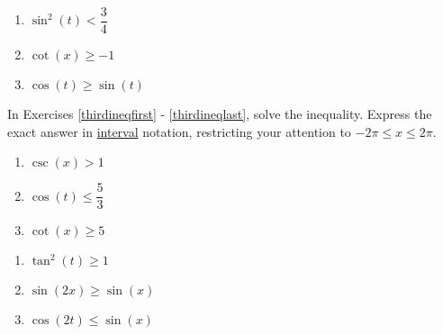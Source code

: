 \documentclass{ximera}
\begin{document}
\begin{multicols}{3}

\begin{enumerate}

\setcounter{enumi}{\value{HW}}

\item $\sin^{2} \left( t \right) < \dfrac{3}{4}$
\item $\cot \left( x \right) \geq -1$ 
\item $\cos(t) \geq \sin(t)$  \label{secondineqlast}

\setcounter{HW}{\value{enumi}}

\end{enumerate}

\end{multicols}


In Exercises \ref{thirdineqfirst} - \ref{thirdineqlast}, solve the inequality.  Express the exact answer in \underline{interval} notation, restricting your attention to $-2\pi \leq x \leq 2\pi$.

\begin{multicols}{3}

\begin{enumerate}

\setcounter{enumi}{\value{HW}}

\item $\csc \left( x \right) > 1$  \label{thirdineqfirst}
\item  $\cos(t) \leq \dfrac{5}{3}$
\item  $\cot(x) \geq 5$ 

\setcounter{HW}{\value{enumi}}

\end{enumerate}

\end{multicols}

\begin{multicols}{3}

\begin{enumerate}

\setcounter{enumi}{\value{HW}}

\item $\tan^{2} \left( t \right) \geq 1$
\item $\sin(2x) \geq \sin(x)$
\item $\cos(2t) \leq \sin(x)$ \label{thirdineqlast}

\setcounter{HW}{\value{enumi}}

\end{enumerate}

\end{multicols}
\end{document}

